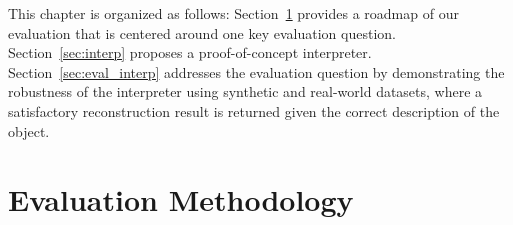 

This chapter is organized as follows: Section~\ref{sec:interp_eval_methodology} provides a roadmap of our evaluation that is centered around one key evaluation question. Section~\ref{sec:interp} proposes a proof-of-concept interpreter. Section~\ref{sec:eval_interp} addresses the evaluation question by demonstrating the robustness of the interpreter using synthetic and real-world datasets, where a satisfactory reconstruction result is returned given the correct description of the object.


\section{Evaluation Methodology}
\label{sec:interp_eval_methodology}

